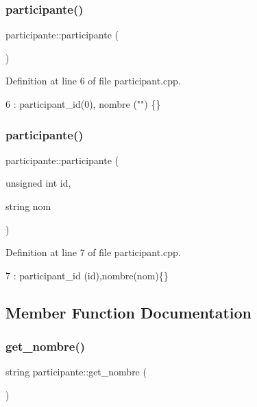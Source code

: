 \subsubsection{\texorpdfstring{participante()}{participante()}\hspace{0.1cm}{\footnotesize\ttfamily [1/2]}}
{\footnotesize\ttfamily participante\+::participante (\begin{DoxyParamCaption}{ }\end{DoxyParamCaption})}



Definition at line 6 of file participant.\+cpp.


\begin{DoxyCode}
6 : participant\_id(0), nombre (\textcolor{stringliteral}{""}) \{\}
\end{DoxyCode}
\mbox{\label{classparticipante_ae5622dd01c7eb4a9b5ab16416713532a}} 
\subsubsection{\texorpdfstring{participante()}{participante()}\hspace{0.1cm}{\footnotesize\ttfamily [2/2]}}
{\footnotesize\ttfamily participante\+::participante (\begin{DoxyParamCaption}\item[{unsigned int}]{id,  }\item[{string}]{nom }\end{DoxyParamCaption})}



Definition at line 7 of file participant.\+cpp.


\begin{DoxyCode}
7 : participant\_id (\textcolor{keywordtype}{id}),nombre(nom)\{\}
\end{DoxyCode}


\subsection{Member Function Documentation}
\mbox{\label{classparticipante_a00d27dd27a5bf61677c8dfc8937e1b43}} 
\subsubsection{\texorpdfstring{get\+\_\+nombre()}{get\_nombre()}}
{\footnotesize\ttfamily string participante\+::get\+\_\+nombre (\begin{DoxyParamCaption}{ }\end{DoxyParamCaption})}



